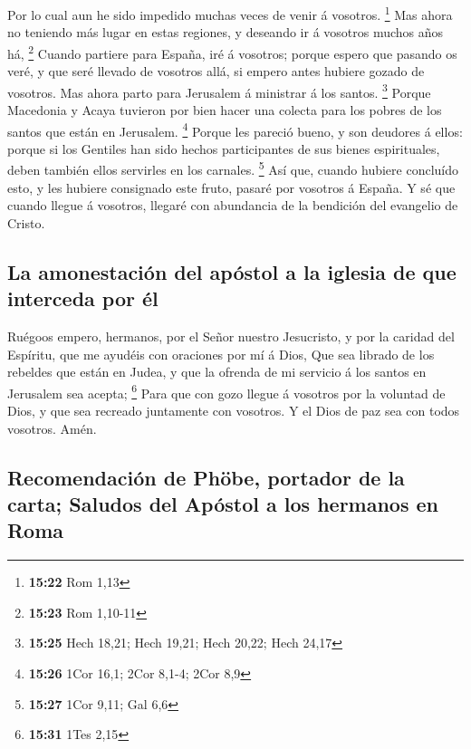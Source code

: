  Por lo cual aun he sido impedido muchas veces de venir á
vosotros. \footnote{\textbf{15:22} Rom 1,13}  Mas ahora no
teniendo más lugar en estas regiones, y deseando ir á vosotros muchos
años há, \footnote{\textbf{15:23} Rom 1,10-11}  Cuando
partiere para España, iré á vosotros; porque espero que pasando os veré,
y que seré llevado de vosotros allá, si empero antes hubiere gozado de
vosotros.  Mas ahora parto para Jerusalem á ministrar á los
santos. \footnote{\textbf{15:25} Hech 18,21; Hech 19,21; Hech 20,22;
  Hech 24,17}  Porque Macedonia y Acaya tuvieron por bien
hacer una colecta para los pobres de los santos que están en Jerusalem.
\footnote{\textbf{15:26} 1Cor 16,1; 2Cor 8,1-4; 2Cor 8,9} 
Porque les pareció bueno, y son deudores á ellos: porque si los Gentiles
han sido hechos participantes de sus bienes espirituales, deben también
ellos servirles en los carnales. \footnote{\textbf{15:27} 1Cor 9,11; Gal
  6,6}  Así que, cuando hubiere concluído esto, y les
hubiere consignado este fruto, pasaré por vosotros á España.
 Y sé que cuando llegue á vosotros, llegaré con abundancia
de la bendición del evangelio de Cristo.

\hypertarget{la-amonestaciuxf3n-del-apuxf3stol-a-la-iglesia-de-que-interceda-por-uxe9l}{%
\subsection{La amonestación del apóstol a la iglesia de que interceda
por
él}\label{la-amonestaciuxf3n-del-apuxf3stol-a-la-iglesia-de-que-interceda-por-uxe9l}}

 Ruégoos empero, hermanos, por el Señor nuestro Jesucristo,
y por la caridad del Espíritu, que me ayudéis con oraciones por mí á
Dios,  Que sea librado de los rebeldes que están en Judea,
y que la ofrenda de mi servicio á los santos en Jerusalem sea acepta;
\footnote{\textbf{15:31} 1Tes 2,15}  Para que con gozo
llegue á vosotros por la voluntad de Dios, y que sea recreado juntamente
con vosotros.  Y el Dios de paz sea con todos vosotros.
Amén.

\hypertarget{recomendaciuxf3n-de-phuxf6be-portador-de-la-carta-saludos-del-apuxf3stol-a-los-hermanos-en-roma}{%
\subsection{Recomendación de Phöbe, portador de la carta; Saludos del
Apóstol a los hermanos en
Roma}\label{recomendaciuxf3n-de-phuxf6be-portador-de-la-carta-saludos-del-apuxf3stol-a-los-hermanos-en-roma}}

